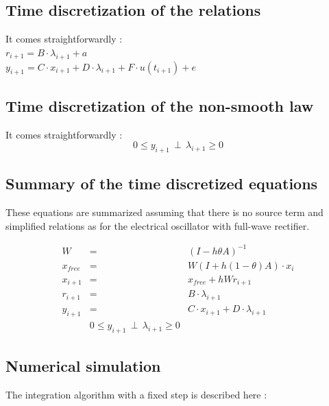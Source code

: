 \documentclass[10pt]{article}
\begin{document}
\subsection{Time discretization of the relations}
It comes straightforwardly :\\

$r_{i+1} = B \cdot \lambda_{i+1} + a$\\

$y_{i+1} = C \cdot x_{i+1} + D \cdot \lambda_{i+1} + F \cdot u(t_{i+1}) + e$\\


\subsection{Time discretization of the non-smooth law}
It comes straightforwardly :
\[
0 \leq y_{i+1} \, \perp \, \lambda_{i+1} \geq 0
\]

\subsection{Summary of the time discretized equations}
These equations are summarized assuming that there is no source term and simplified relations as for the
electrical oscillator with full-wave rectifier.

\begin{eqnarray*}
W & = & (I - h \theta A)^{-1} \\
x_{free} & = & W(I + h (1-\theta) A) \cdot x_{i} \\
x_{i+1} & = & x_{free} + h W r_{i+1} \\
r_{i+1} & = & B \cdot \lambda_{i+1}  \\
y_{i+1} & = & C \cdot x_{i+1} + D \cdot \lambda_{i+1}  \\
 & 0 \leq y_{i+1} \, \perp \, \lambda_{i+1} \geq 0 &
\end{eqnarray*}

\subsection{Numerical simulation}
The integration algorithm with a fixed step is described here :
\end{document}
